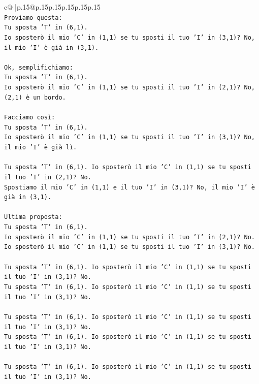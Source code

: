 \documentclass{article}
\begin{document}
{\begin{supertabular}{c@{$\;$}|p{.15\linewidth}@{}p{.15\linewidth}p{.15\linewidth}p{.15\linewidth}p{.15\linewidth}p{.15\linewidth}}
{{{\\ 
\texttt{Proviamo questa:} \\
\texttt{Tu sposta 'T' in (6,1).} \\
\texttt{Io sposterò il mio 'C' in (1,1) se tu sposti il tuo 'I' in (3,1)? No, il mio 'I' è già in (3,1).} \\
\\ 
\texttt{Ok, semplifichiamo:} \\
\texttt{Tu sposta 'T' in (6,1).} \\
\texttt{Io sposterò il mio 'C' in (1,1) se tu sposti il tuo 'I' in (2,1)? No, (2,1) è un bordo.} \\
\\ 
\texttt{Facciamo così:} \\
\texttt{Tu sposta 'T' in (6,1).} \\
\texttt{Io sposterò il mio 'C' in (1,1) se tu sposti il tuo 'I' in (3,1)? No, il mio 'I' è già lì.} \\
\\ 
\texttt{Tu sposta 'T' in (6,1). Io sposterò il mio 'C' in (1,1) se tu sposti il tuo 'I' in (2,1)? No.} \\
\texttt{Spostiamo il mio 'C' in (1,1) e il tuo 'I' in (3,1)? No, il mio 'I' è già in (3,1).} \\
\\ 
\texttt{Ultima proposta:} \\
\texttt{Tu sposta 'T' in (6,1).} \\
\texttt{Io sposterò il mio 'C' in (1,1) se tu sposti il tuo 'I' in (2,1)? No.} \\
\texttt{Io sposterò il mio 'C' in (1,1) se tu sposti il tuo 'I' in (3,1)? No.} \\
\\ 
\texttt{Tu sposta 'T' in (6,1). Io sposterò il mio 'C' in (1,1) se tu sposti il tuo 'I' in (3,1)? No.} \\
\texttt{Tu sposta 'T' in (6,1). Io sposterò il mio 'C' in (1,1) se tu sposti il tuo 'I' in (3,1)? No.} \\
\\ 
\texttt{Tu sposta 'T' in (6,1). Io sposterò il mio 'C' in (1,1) se tu sposti il tuo 'I' in (3,1)? No.} \\
\texttt{Tu sposta 'T' in (6,1). Io sposterò il mio 'C' in (1,1) se tu sposti il tuo 'I' in (3,1)? No.} \\
\\ 
\texttt{Tu sposta 'T' in (6,1). Io sposterò il mio 'C' in (1,1) se tu sposti il tuo 'I' in (3,1)? No.} \\
}}}
\end{supertabular}}
\end{document}
